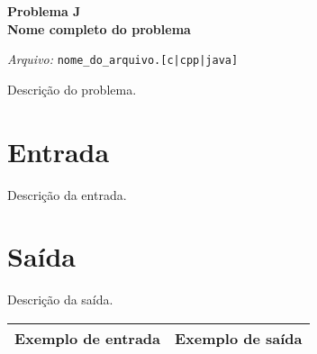 \newpage

\begin{center}
\LARGE{\textbf{Problema J} \\ \textbf{Nome completo do problema}} 

\vspace{0.5em}
\normalsize

\textit{Arquivo:}
\verb+nome_do_arquivo.[c|cpp|java]+  

\end{center}

Descrição do problema. \\

\section*{Entrada}

Descrição da entrada. \\

\section*{Saída}

Descrição da saída. \\

\begin{center}
  \begin{tabular}{ | l | l | }
    \hline
    \textbf{Exemplo de entrada} & \textbf{Exemplo de saída} \\ 
    \hline
	
	\hline
  \end{tabular}
\end{center}